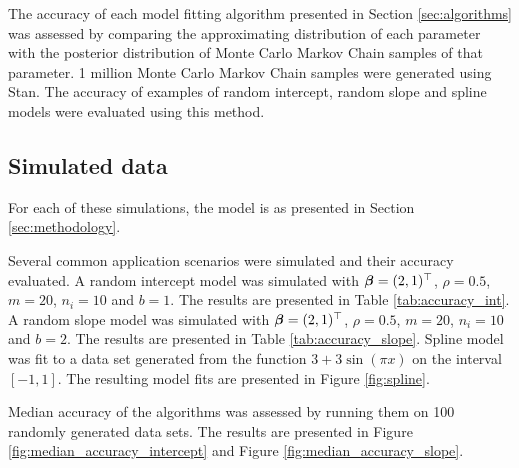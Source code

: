\documentclass[times, doublespace]{anzsauth}
\begin{document}
	The accuracy of each model fitting algorithm presented in Section \ref{sec:algorithms} was assessed by
	comparing the approximating distribution of each parameter with the posterior distribution of Monte Carlo
	Markov Chain samples of that parameter. 1 million Monte Carlo Markov Chain samples were generated using Stan.
	The accuracy of examples of random intercept, random slope and spline models were evaluated using this method.
	
	\subsection{Simulated data}
	
	For each of these simulations, the model is as presented in Section \ref{sec:methodology}.
	
	\noindent Several common application scenarios were simulated and their accuracy evaluated. A random intercept model was simulated with ${\boldsymbol \beta} = (2, 1)^\top$, $\rho = 0.5$, $m = 20$, $n_i = 10$ and $b = 1$. The results are
	presented in Table \ref{tab:accuracy_int}. A random slope model was simulated with ${\boldsymbol \beta} = (2, 1)^\top$,
	$\rho = 0.5$, $m = 20$, $n_i = 10$ and $b = 2$. The results are presented in Table \ref{tab:accuracy_slope}.
	Spline model was fit to a data set generated from the function $3 + 3 \sin{(\pi x)}$ on the interval $[-1,
	1]$. The resulting model fits are presented in Figure \ref{fig:spline}.
	
	
	\noindent Median accuracy of the algorithms was assessed by running them on 100 randomly generated data sets. The	results are presented in Figure \ref{fig:median_accuracy_intercept} and Figure
	\ref{fig:median_accuracy_slope}.
	
\end{document}
